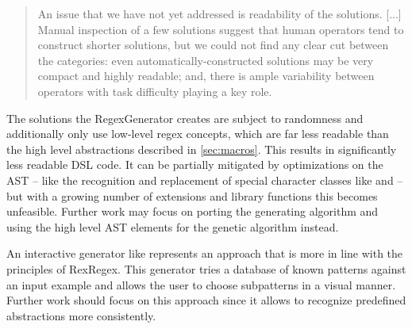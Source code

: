 {\small
\begin{quote}
An issue that we have not yet addressed is readability of the solutions. [...] Manual inspection of a few solutions suggest that human operators tend to construct shorter solutions, but we could not find any clear cut between the categories: even automatically-constructed solutions may be very compact and highly readable; and, there is ample variability between operators with task difficulty playing a key role. \cite{bartoli2016can}
\end{quote}
}

The solutions the RegexGenerator creates are subject to randomness and additionally only use low-level regex concepts, which are far less readable than the high level abstractions described in \ref{sec:macros}. This results in significantly less readable DSL code. It can be partially mitigated by optimizations on the AST -- like the recognition and replacement of special character classes like  and  -- but with a growing number of extensions and library functions this becomes unfeasible. Further work may focus on porting the generating algorithm and using the high level AST elements for the genetic algorithm instead.

An interactive generator like \cite{noxoneRegexGenerator} represents an approach that is more in line with the principles of RexRegex. This generator tries a database of known patterns against an input example and allows the user to choose subpatterns in a visual manner. Further work should focus on this approach since it allows to recognize predefined abstractions more consistently.



